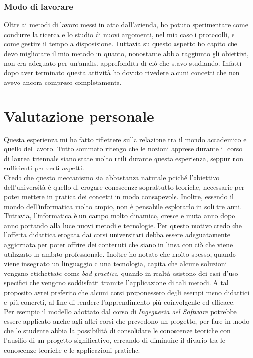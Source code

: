 \subsubsection{Modo di lavorare}
Oltre ai metodi di lavoro messi in atto dall'azienda, ho potuto sperimentare come condurre la ricerca e lo studio di nuovi argomenti, nel mio caso i protocolli, e come gestire il tempo a disposizione. Tuttavia su questo aspetto ho capito che devo migliorare il mio metodo in quanto, nonostante abbia raggiunto gli obiettivi, non era adeguato per un'analisi approfondita di ciò che stavo studiando. Infatti dopo aver terminato questa attività ho dovuto rivedere alcuni concetti che non avevo ancora compreso completamente.
\section{Valutazione personale}
Questa esperienza mi ha fatto riflettere sulla relazione tra il mondo accademico e quello del lavoro. Tutto sommato ritengo che le nozioni apprese durante il corso di laurea triennale siano state molto utili durante questa esperienza, seppur non sufficienti per certi aspetti. \\
Credo che questo meccanismo sia abbastanza naturale poiché l'obiettivo dell'università è quello di erogare conoscenze soprattutto teoriche, necessarie per poter mettere in pratica dei concetti in modo consapevole. Inoltre, essendo il mondo dell'informatica molto ampio, non è pensabile esplorarlo in soli tre anni. \\
Tuttavia, l'informatica è un campo molto dinamico, cresce e muta anno dopo anno portando alla luce nuovi metodi e tecnologie. Per questo motivo credo che l'offerta didattica erogata dai corsi universitari debba essere adeguatamente aggiornata per poter offrire dei contenuti che siano in linea con ciò che viene utilizzato in ambito professionale. Inoltre ho notato che molto spesso, quando viene insegnato un linguaggio o una tecnologia, capita che alcune soluzioni vengano etichettate come \textit{bad practice}, quando in realtà esistono dei casi d'uso specifici che vengono soddisfatti tramite l'applicazione di tali metodi. A tal proposito avrei preferito che alcuni corsi proponessero degli esempi meno didattici e più concreti, al fine di rendere l'apprendimento più coinvolgente ed efficace. \\
Per esempio il modello adottato dal corso di \textit{Ingegneria del Software} potrebbe essere applicato anche agli altri corsi che prevedono un progetto, per fare in modo che lo studente abbia la possibilità di consolidare le conoscenze teoriche con l'ausilio di un progetto significativo, cercando di diminuire il divario tra le conoscenze teoriche e le applicazioni pratiche. \\
